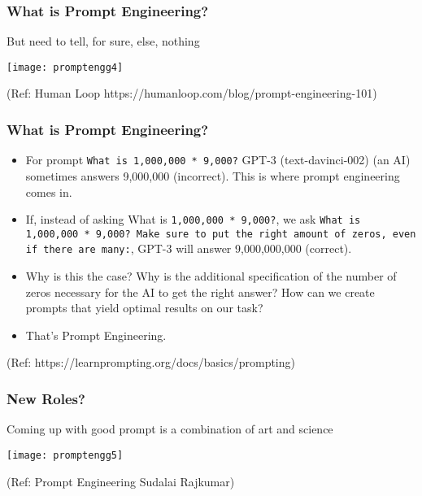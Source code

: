 \begin{frame}[fragile]\frametitle{What is Prompt Engineering?}

But need to tell, for sure, else, nothing


\begin{center}
\texttt{[image: promptengg4]}

{\tiny (Ref: Human Loop https://humanloop.com/blog/prompt-engineering-101)}

\end{center}				

\end{frame}


\begin{frame}[fragile]\frametitle{What is Prompt Engineering?}

\begin{itemize}
\item For prompt \lstinline|What is 1,000,000 * 9,000?| GPT-3 (text-davinci-002) (an AI) sometimes answers 9,000,000 (incorrect). This is where prompt engineering comes in.
\item If, instead of asking What is \lstinline|1,000,000 * 9,000?|, we ask \lstinline|What is 1,000,000 * 9,000? Make sure to put the right amount of zeros, even if there are many:|, GPT-3 will answer 9,000,000,000 (correct). 
\item Why is this the case? Why is the additional specification of the number of zeros necessary for the AI to get the right answer? How can we create prompts that yield optimal results on our task? 			
\item That's Prompt Engineering.
\end{itemize}

{\tiny (Ref: https://learnprompting.org/docs/basics/prompting)}
\end{frame}

\begin{frame}[fragile]\frametitle{New Roles?}

Coming up with good prompt is a combination of art and science

\begin{center}
\texttt{[image: promptengg5]}

{\tiny (Ref: Prompt Engineering Sudalai Rajkumar)}

\end{center}		
		


\end{frame}

